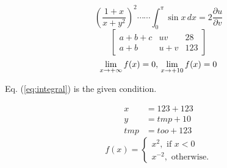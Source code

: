 \documentclass{amsart}
\begin{document}
  \[{\left(\frac{1+x}{x+y^2}\right)}^2 \cdots \cdots
  \int_{0}^{\pi} \sin x \, dx = 2
  \frac{\partial u}{\partial v}\]
  \begin{equation}
    \left[
      \begin{matrix}
        a+b+c & uv & 28\\
        a+b & u+v & 123
      \end{matrix}
    \right]
  \end{equation}
  \begin{equation} \label{eq:integral}
    \displaystyle \lim_{x \to +\infty}f(x) = 0, \text{\\}
    \displaystyle \lim_{x \to +10}f(x) = 0
  \end{equation}
  
  Eq. (\ref{eq:integral}) is the given condition.
  
  \begin{align*}
    x &= 123 +123\\
    y &= tmp + 10\\
    tmp &= too + 123 \nonumber
  \end{align*}
  \begin{equation}
    f(x)=
    \begin{cases}
      x^2, \text{ if $x<0$}\\[100pt]
      x^{-2}, \text{ otherwise.}
    \end{cases}
  \end{equation}  
\end{document}
